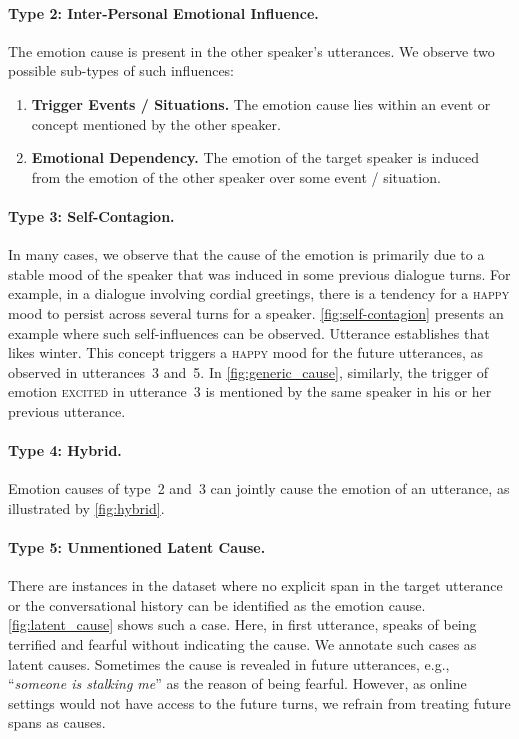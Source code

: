 \documentclass[11pt,a4paper]{article}
\theoremstyle{definition}
\newcommand\emo[1]{\textsc{#1}}
\begin{document}
\paragraph{Type 2: Inter-Personal Emotional Influence.}
The emotion cause is present in the other speaker's utterances.
We observe two possible sub-types of such influences:
\begin{enumerate}[label=2\alph*)]
    \item \textbf{Trigger Events / Situations.} The emotion cause lies within an event or concept mentioned by the other speaker.
    \item \textbf{Emotional Dependency.} The emotion of the target speaker is induced from the emotion of the other speaker over some event / situation.
\end{enumerate}

\paragraph{Type 3: Self-Contagion.}
In many cases, we observe that the cause of the emotion is primarily due to a stable mood of the speaker that was induced in some previous dialogue turns. For example, in a dialogue involving cordial greetings, there is a tendency for a \emo{happy} mood to persist across several turns for a speaker. \cref{fig:self-contagion} presents an example where such self-influences can be observed. Utterance  establishes that  likes winter. This concept triggers a \emo{happy} mood for the future utterances, as observed in utterances~3 and~5. In \cref{fig:generic_cause}, similarly, the trigger of emotion \emo{excited} in utterance~3 is mentioned by the same speaker in his or her previous utterance.

\paragraph{Type 4: Hybrid.} Emotion causes of type~2 and~3 can jointly cause the emotion of an utterance, as illustrated by \cref{fig:hybrid}.




\paragraph{Type 5: Unmentioned Latent Cause.} There are instances in the dataset where no explicit span in the target utterance or the conversational history can be identified as the emotion cause. \cref{fig:latent_cause} shows such a case. Here, in first utterance,  speaks of being terrified and fearful without indicating the cause. We annotate such cases as latent causes. Sometimes the cause is revealed in future utterances, e.g., ``\textit{someone is stalking me}'' as the reason of being fearful. However, as online settings would not have access to the future turns, we refrain from treating future spans as 
causes.
\end{document}
